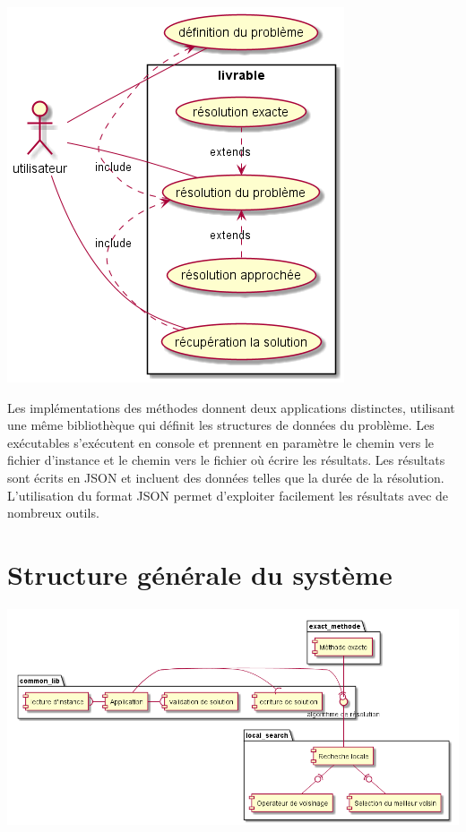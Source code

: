 \includegraphics[width=\textwidth]{parts/description_generale/use_cases}

Les implémentations des méthodes donnent deux applications distinctes, utilisant une même bibliothèque qui définit les structures de données du problème.
Les exécutables s'exécutent en console et prennent en paramètre le chemin vers le fichier d'instance et
le chemin vers le fichier où écrire les résultats.
Les résultats sont écrits en JSON et incluent des données telles que la durée de la résolution.
L'utilisation du format JSON permet d'exploiter facilement les résultats avec de nombreux outils.


\section{Structure générale du système}



\includegraphics[width=\textwidth]{parts/description_generale/composants}

